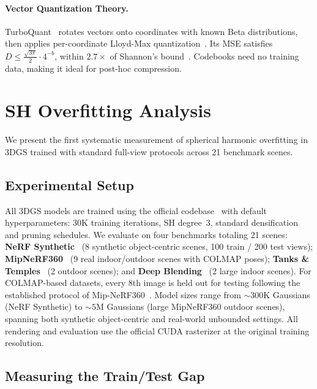 \documentclass[sigconf,review]{acmart}
\begin{document}
\paragraph{Vector Quantization Theory.}
TurboQuant~\cite{zandieh2025turboquant} rotates vectors onto coordinates with known Beta distributions, then applies per-coordinate Lloyd-Max quantization~\cite{lloyd1982least}.
Its MSE satisfies $D \leq \frac{\sqrt{3\pi}}{2} \cdot 4^{-b}$, within $2.7{\times}$ of Shannon's bound~\cite{shannon1948, gersho1979asymptotically}.
Codebooks need no training data, making it ideal for post-hoc compression.

\section{SH Overfitting Analysis}
\label{sec:overfitting}

We present the first systematic measurement of spherical harmonic overfitting in 3DGS trained with standard full-view protocols across 21 benchmark scenes.

\subsection{Experimental Setup}
\label{sec:setup}

All 3DGS models are trained using the official codebase~\cite{kerbl2023gaussians} with default hyperparameters: 30K training iterations, SH degree~3, standard densification and pruning schedules.
We evaluate on four benchmarks totaling 21 scenes:
\textbf{NeRF Synthetic}~\cite{mildenhall2020nerf} (8 synthetic object-centric scenes, 100 train / 200 test views);
\textbf{MipNeRF360}~\cite{barron2022mipnerf360} (9 real indoor/outdoor scenes with COLMAP poses);
\textbf{Tanks \& Temples}~\cite{knapitsch2017tanks} (2 outdoor scenes); and
\textbf{Deep Blending}~\cite{hedman2018deep} (2 large indoor scenes).
For COLMAP-based datasets, every 8th image is held out for testing following the established protocol of Mip-NeRF360~\cite{barron2022mipnerf360}.
Model sizes range from ${\sim}300$K Gaussians (NeRF Synthetic) to ${\sim}5$M Gaussians (large MipNeRF360 outdoor scenes), spanning both synthetic object-centric and real-world unbounded settings.
All rendering and evaluation use the official CUDA rasterizer at the original training resolution.

\subsection{Measuring the Train/Test Gap}
\label{sec:gap}
\end{document}
